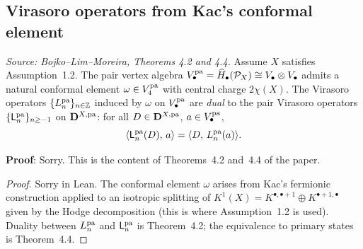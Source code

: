 \subsection{Virasoro operators from Kac's conformal element}


\begin{theorem}[ConformalElementPair]
  \label{thm:conformal-element-pair}
  \textit{Source: Bojko--Lim--Moreira, Theorems 4.2 and 4.4.}
  Assume \(X\) satisfies Assumption~1.2. The pair vertex algebra
  \(V_\bullet^{\mathrm{pa}} = \widehat{H}_\bullet(\mathcal{P}_X) \cong V_\bullet \otimes V_\bullet\)
  admits a natural conformal element \(\omega \in V_4^{\mathrm{pa}}\) with central charge
  \(2\chi(X)\). The Virasoro operators \(\{L_n^{\mathrm{pa}}\}_{n \in \mathbb{Z}}\) induced by
  \(\omega\) on \(V_\bullet^{\mathrm{pa}}\) are \emph{dual} to the pair Virasoro operators
  \(\{\mathsf{L}_n^{\mathrm{pa}}\}_{n \geq -1}\) on \(\mathbf{D}^{X,\mathrm{pa}}\): for all \(D \in \mathbf{D}^{X,\mathrm{pa}}\),
  \(a \in V_\bullet^{\mathrm{pa}}\),
  \[\langle \mathsf{L}_n^{\mathrm{pa}}(D),\, a \rangle = \langle D,\, L_n^{\mathrm{pa}}(a) \rangle.\]

  \textbf{Proof}: Sorry. This is the content of Theorems~4.2 and~4.4 of the paper.
\end{theorem}

\begin{proof}
  Sorry in Lean. The conformal element \(\omega\) arises from Kac's fermionic
  construction applied to an isotropic splitting of
  \(K^1(X) = K^{\bullet,\bullet+1} \oplus K^{\bullet+1,\bullet}\) given by the
  Hodge decomposition (this is where Assumption~1.2 is used). Duality between
  \(L_n^{\mathrm{pa}}\) and \(\mathsf{L}_n^{\mathrm{pa}}\) is Theorem~4.2; the equivalence to primary states
  is Theorem~4.4.
\end{proof}

